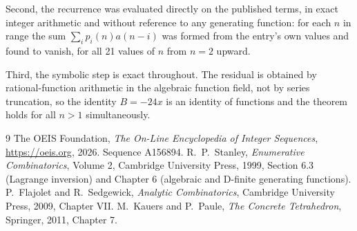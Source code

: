 \documentclass[11pt,a4paper]{article}
\theoremstyle{plain}
\theoremstyle{definition}
\begin{document}
Second, the recurrence was evaluated directly on the published terms, in exact integer
arithmetic and without reference to any generating function: for each $n$ in range the sum
$\sum_{i}p_{i}(n)a(n-i)$ was formed from the entry's own values and found to vanish, for
all 21 values of $n$ from $n=2$ upward.

Third, the symbolic step is exact throughout. The residual is obtained by
rational-function arithmetic in the algebraic function field, not by series truncation, so
the identity $B=- 24 x$ is an identity of functions and the theorem holds for all
$n>1$ simultaneously.

\begin{thebibliography}{9}
 The OEIS Foundation, \emph{The On-Line Encyclopedia of Integer Sequences},
\url{https://oeis.org}, 2026. Sequence A156894.
 R.~P.~Stanley, \emph{Enumerative Combinatorics}, Volume 2, Cambridge
University Press, 1999, Section 6.3 (Lagrange inversion) and Chapter 6 (algebraic and
D-finite generating functions).
 P.~Flajolet and R.~Sedgewick, \emph{Analytic Combinatorics}, Cambridge
University Press, 2009, Chapter VII.
 M.~Kauers and P.~Paule, \emph{The Concrete Tetrahedron}, Springer, 2011,
Chapter 7.
\end{thebibliography}
\end{document}
